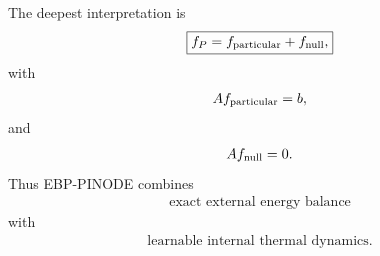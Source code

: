 \documentclass[11pt]{article}
\begin{document}
The deepest interpretation is
\begin{align}
\boxed{f_P=f_{\rm particular}+f_{\rm null},}
\end{align}
with
\begin{align}
Af_{\rm particular}=b,
\end{align}
and
\begin{align}
Af_{\rm null}=0.
\end{align}
Thus EBP-PINODE combines
\begin{align}
\boxed{\text{exact external energy balance}}
\end{align}
with
\begin{align}
\boxed{\text{learnable internal thermal dynamics}.}
\end{align}
\end{document}
